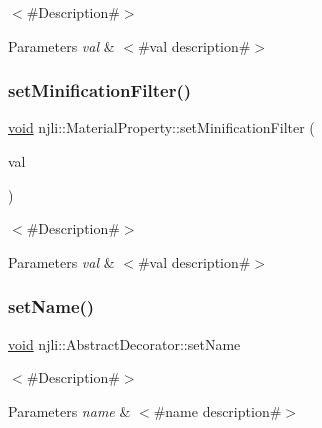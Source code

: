 $<$\#\+Description\#$>$


\begin{DoxyParams}{Parameters}
{\em val} & $<$\#val description\#$>$ \\
\hline
\end{DoxyParams}
\mbox{\label{classnjli_1_1_material_property_a252a4ebb78f314af5eeec14ebd794692}} 
\subsubsection{\texorpdfstring{set\+Minification\+Filter()}{setMinificationFilter()}}
{\footnotesize\ttfamily \mbox{\hyperlink{_thread_8h_af1e856da2e658414cb2456cb6f7ebc66}{void}} njli\+::\+Material\+Property\+::set\+Minification\+Filter (\begin{DoxyParamCaption}\item[{\mbox{\hyperlink{namespacenjli_a980b62f11da3b7143a525012cb512bac}{njli\+Texture\+Minification\+Value\+Type}}}]{val }\end{DoxyParamCaption})}

$<$\#\+Description\#$>$


\begin{DoxyParams}{Parameters}
{\em val} & $<$\#val description\#$>$ \\
\hline
\end{DoxyParams}
\mbox{\label{classnjli_1_1_material_property_a087eb5f8d9f51cc476f12f1d10a3cb95}} 
\subsubsection{\texorpdfstring{set\+Name()}{setName()}}
{\footnotesize\ttfamily \mbox{\hyperlink{_thread_8h_af1e856da2e658414cb2456cb6f7ebc66}{void}} njli\+::\+Abstract\+Decorator\+::set\+Name}

$<$\#\+Description\#$>$


\begin{DoxyParams}{Parameters}
{\em name} & $<$\#name description\#$>$ \\
\hline
\end{DoxyParams}
\mbox{\label{classnjli_1_1_material_property_a1ec8ff2f8e2d6289361d1fe9c8838807}} 
